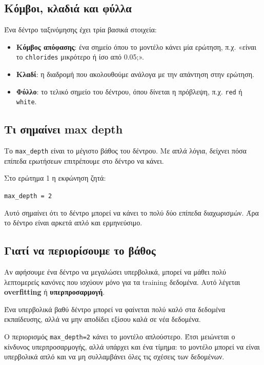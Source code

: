\documentclass[12pt,a4paper]{article}
\newcommand{\code}[1]{\texttt{\textenglish{#1}}}
\begin{document}
\subsection{Κόμβοι, κλαδιά και φύλλα}

Ένα δέντρο ταξινόμησης έχει τρία βασικά στοιχεία:

\begin{itemize}
    \item \textbf{Κόμβος απόφασης}: ένα σημείο όπου το μοντέλο κάνει μία
    ερώτηση, π.χ. «είναι το \code{chlorides} μικρότερο ή ίσο από 0.05;».
    \item \textbf{Κλαδί}: η διαδρομή που ακολουθούμε ανάλογα με την απάντηση
    στην ερώτηση.
    \item \textbf{Φύλλο}: το τελικό σημείο του δέντρου, όπου δίνεται η
    πρόβλεψη, π.χ. \code{red} ή \code{white}.
\end{itemize}

\subsection{Τι σημαίνει max depth}

Το \code{max\_depth} είναι το μέγιστο βάθος του δέντρου. Με απλά λόγια, δείχνει
πόσα επίπεδα ερωτήσεων επιτρέπουμε στο δέντρο να κάνει.

Στο ερώτημα 1 η εκφώνηση ζητά:

\begin{center}
\code{max\_depth = 2}
\end{center}

Αυτό σημαίνει ότι το δέντρο μπορεί να κάνει το πολύ δύο επίπεδα διαχωρισμών.
Άρα το δέντρο είναι αρκετά απλό και ερμηνεύσιμο.

\subsection{Γιατί να περιορίσουμε το βάθος}

Αν αφήσουμε ένα δέντρο να μεγαλώσει υπερβολικά, μπορεί να μάθει πολύ
λεπτομερείς κανόνες που ισχύουν μόνο για τα training δεδομένα. Αυτό λέγεται
\textbf{overfitting} ή \textbf{υπερπροσαρμογή}.

Ένα υπερβολικά βαθύ δέντρο μπορεί να φαίνεται πολύ καλό στα δεδομένα
εκπαίδευσης, αλλά να μην αποδίδει εξίσου καλά σε νέα δεδομένα.

Ο περιορισμός \code{max\_depth=2} κάνει το μοντέλο απλούστερο. Έτσι μειώνεται
ο κίνδυνος υπερπροσαρμογής, αλλά υπάρχει και ένα τίμημα: το μοντέλο μπορεί να
είναι υπερβολικά απλό και να μη συλλαμβάνει όλες τις σχέσεις των δεδομένων.
\end{document}
